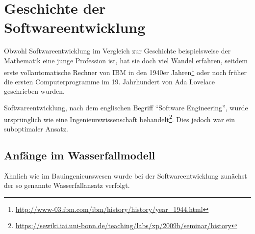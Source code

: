 \section{Geschichte der Softwareentwicklung}
	\label{sec:history}
	Obwohl Softwareentwicklung im Vergleich zur Geschichte beispielsweise der Mathematik eine junge Profession ist, hat sie doch viel Wandel erfahren, seitdem erste vollautomatische Rechner von IBM in den 1940er Jahren\footnote{
		\url{http://www-03.ibm.com/ibm/history/history/year_1944.html}
	} oder noch früher die ersten Computerprogramme im 19. Jahrhundert von Ada Lovelace geschrieben wurden.

	Softwareentwicklung, nach dem englischen Begriff ``Software Engineering'', wurde ursprünglich wie eine Ingenieurswissenschaft behandelt\footnote{
		\url{https://sewiki.iai.uni-bonn.de/teaching/labs/xp/2009b/seminar/history}
	}.
	Dies jedoch war ein suboptimaler Ansatz.
	\subsection{Anfänge im Wasserfallmodell}
		\label{ssec:waterfall}
		Ähnlich wie im Bauingenieurswesen wurde bei der Softwareentwicklung zunächst der so genannte Wasserfallansatz verfolgt.
		
